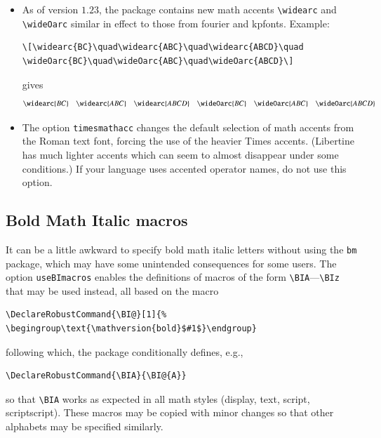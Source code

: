 \documentclass[\fsc]{article}
\theoremstyle{oldplain}
\theoremstyle{plain}
\begin{document}
\begin{itemize}
\begin{itemize}
\begin{verbatim}
\[\overgroup{ABC}\quad\overgroupra{ABC}\quad\undergroup{ABC}\quad
\undergroupla{ABC}\quad \widering{ABCD}\] 
\end{verbatim}
gives
\[\overgroup{ABC}\quad\overgroupra{ABC}\quad\undergroup{ABC}\quad\undergroupla{ABC}\quad\widering{ABCD}\] 
\end{itemize}
\item As of version $1.23$, the package contains new math accents \verb|\widearc| and \verb|\wideOarc| similar in effect to those from \textsf{fourier} and \textsf{kpfonts}. Example: 
\begin{verbatim}
\[\widearc{BC}\quad\widearc{ABC}\quad\widearc{ABCD}\quad
\wideOarc{BC}\quad\wideOarc{ABC}\quad\wideOarc{ABCD}\]
\end{verbatim}
gives
\[\widearc{BC}\quad\widearc{ABC}\quad\widearc{ABCD}\quad
\wideOarc{BC}\quad\wideOarc{ABC}\quad\wideOarc{ABCD}\]
\item The option {\tt timesmathacc} changes the default selection of math accents from the Roman text font, forcing the use of the heavier Times accents. (Libertine has much lighter accents which can seem to almost disappear under some conditions.) If your language uses accented operator names, do not use this option.
\end{itemize}
\bigskip

\subsection{Bold Math Italic macros}
It can be a little awkward to specify bold math italic letters without using the \texttt{bm} package, which may have some unintended consequences for some users. The option \texttt{useBImacros} enables the definitions of macros of the form \verb|\BIA|---\verb|\BIz| that may be used instead, all based on the macro 
\begin{verbatim}
\DeclareRobustCommand{\BI@}[1]{%
\begingroup\text{\mathversion{bold}$#1$}\endgroup}
\end{verbatim}
following which, the package conditionally defines, e.g.,
\begin{verbatim}
\DeclareRobustCommand{\BIA}{\BI@{A}}
\end{verbatim}
so that \verb|\BIA| works as expected in all math styles (display, text, script, scriptscript). These macros may be copied with minor changes so that other alphabets may be specified similarly.
\end{document}
